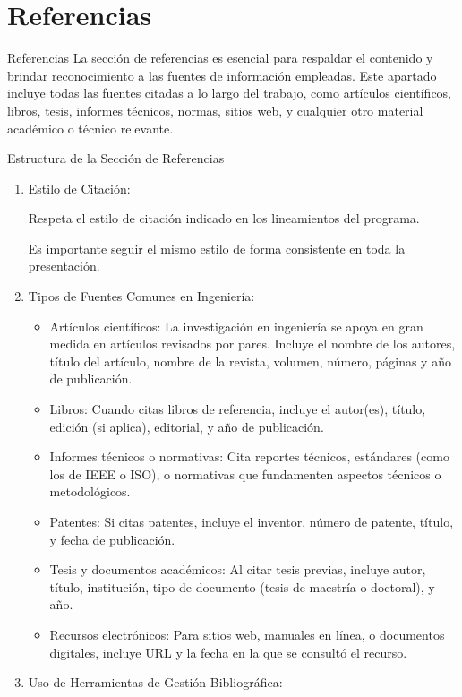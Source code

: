 \documentclass[9pt]{beamer}
\begin{document}
\section{Referencias}
\begin{frame}{Referencias}
La sección de referencias es esencial para respaldar el contenido y brindar reconocimiento a las fuentes de información empleadas. Este apartado incluye todas las fuentes citadas a lo largo del trabajo, como artículos científicos, libros, tesis, informes técnicos, normas, sitios web, y cualquier otro material académico o técnico relevante.

Estructura de la Sección de Referencias

\begin{enumerate}
    \item Estilo de Citación:

    Respeta el estilo de citación indicado en los lineamientos del programa. 
    
    Es importante seguir el mismo estilo de forma consistente en toda la presentación.

    \item Tipos de Fuentes Comunes en Ingeniería:
    \begin{itemize}
        \item Artículos científicos: La investigación en ingeniería se apoya en gran medida en artículos revisados por pares. Incluye el nombre de los autores, título del artículo, nombre de la revista, volumen, número, páginas y año de publicación.
        \item Libros: Cuando citas libros de referencia, incluye el autor(es), título, edición (si aplica), editorial, y año de publicación.
        \item Informes técnicos o normativas: Cita reportes técnicos, estándares (como los de IEEE o ISO), o normativas que fundamenten aspectos técnicos o metodológicos.
        \item Patentes: Si citas patentes, incluye el inventor, número de patente, título, y fecha de publicación.
        \item Tesis y documentos académicos: Al citar tesis previas, incluye autor, título, institución, tipo de documento (tesis de maestría o doctoral), y año.
        \item Recursos electrónicos: Para sitios web, manuales en línea, o documentos digitales, incluye URL y la fecha en la que se consultó el recurso.
    \end{itemize}
    \item Uso de Herramientas de Gestión Bibliográfica:


\end{enumerate}
\end{frame}
\end{document}
